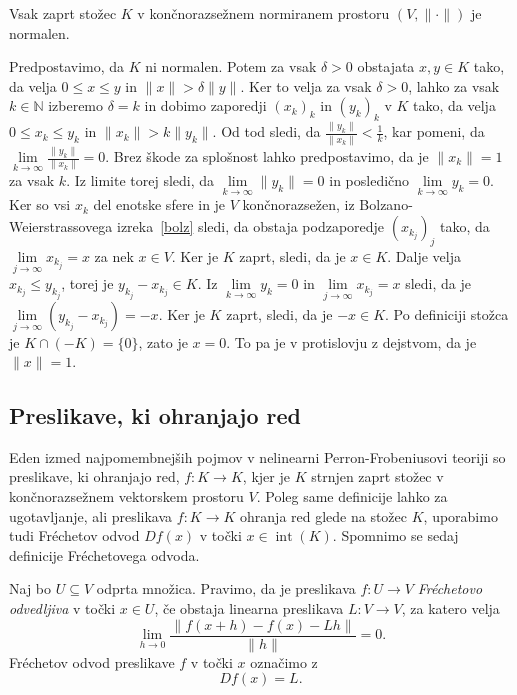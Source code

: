 \documentclass[mat2, tisk]{fmfdelo}
\newcommand{\N}{\mathbb{N}}
\begin{document}
\begin{lema}
Vsak zaprt stožec $K$ v končnorazsežnem normiranem prostoru $(V, \|\cdot\|)$ je normalen.
\end{lema}
\begin{dokaz}
  Predpostavimo, da $K$ ni normalen. Potem za vsak
  $\delta>0$ obstajata $x,y\in K$ tako, da velja
  $0\leq x\leq y$ in $\|x\|>\delta\|y\|$.
  Ker to velja za vsak $\delta>0$, lahko za vsak
  $k\in\N$ izberemo $\delta=k$ in dobimo zaporedji
  $(x_k)_k$ in $(y_k)_k$ v $K$ tako, da velja
  $0\leq x_k\leq y_k$ in $\|x_k\|>k\|y_k\|$. Od tod sledi, da $\frac{\|y_k\| }{\|x_k\| } < \frac{1}{k}$, kar 
  pomeni, da $\lim\limits_{k \to \infty} \frac{\|y_k\| }{\|x_k\| }  = 0$. Brez škode za splošnost 
  lahko predpostavimo, da je $\|x_k\| = 1$ za vsak $k$. Iz limite torej sledi, da 
  $\lim\limits_{k \to \infty} \|y_k\| = 0$ in posledično $\lim\limits_{k \to \infty} y_k = 0$. 
  Ker so vsi $x_k$ del enotske sfere in je $V$ končnorazsežen, iz Bolzano-Weierstrassovega izreka~\ref{bolz}
  sledi, da obstaja podzaporedje $(x_{k_j})_j$ tako, 
  da $\lim\limits_{j \to \infty} x_{k_j} = x$ za nek $x \in V$. Ker je $K$ zaprt, sledi, da je 
  $x \in K$. Dalje velja $x_{k_j} \leq y_{k_j}$, 
  torej je $y_{k_j} - x_{k_j} \in K$. Iz $\lim\limits_{k \to \infty} y_k = 0$ in $\lim\limits_{j \to \infty} x_{k_j} = x$
  sledi, da je $\lim\limits_{j \to \infty} (y_{k_j} - x_{k_j}) = -x$. Ker je $K$ zaprt, sledi, da je $-x \in K$. 
  Po definiciji stožca je $ K \cap (-K) = \{0\}$, zato je $x = 0$. To pa je v protislovju z dejstvom, da je $\|x\| = 1$.
\end{dokaz}



\subsection{Preslikave, ki ohranjajo red}

Eden izmed najpomembnejših pojmov v nelinearni Perron-Frobeniusovi teoriji so preslikave, ki ohranjajo red,
$f : K \to K$, kjer je $K$ strnjen zaprt stožec v končnorazsežnem vektorskem prostoru $V$.
Poleg same definicije lahko za ugotavljanje, ali preslikava
$f : K \to K$
ohranja red glede na stožec $K$, uporabimo tudi Fréchetov odvod
$Df(x)$ v točki $x \in \operatorname{int}(K)$.
Spomnimo se sedaj definicije Fréchetovega odvoda.
\begin{definicija}
  Naj bo  $U \subseteq V$ odprta množica. Pravimo, da je preslikava
  $f : U \to V$ \emph{Fréchetovo odvedljiva} v točki $x \in U$, če obstaja linearna preslikava
  $L : V \to V$, za katero velja
  \[
  \lim_{h \to 0}
  \frac{\|f(x+h)-f(x)-Lh\|}{\|h\|}
  =0.
  \]
  Fréchetov odvod preslikave $f$ v točki $x$ označimo z
  \[
  Df(x)=L.
  \]
\end{definicija}
\end{document}
